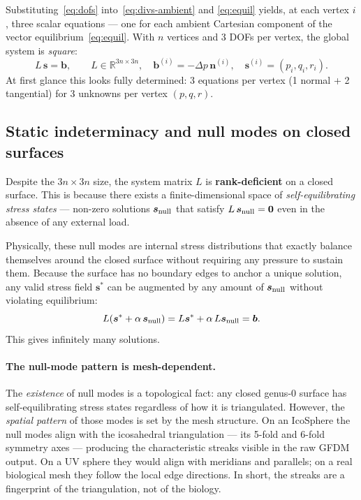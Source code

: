 \documentclass[11pt]{article}
\newcommand{\vv}[1]{\bm{#1}}          %
\newcommand{\nn}{\vv{n}}               %
\begin{document}
Substituting~\eqref{eq:dofs} into~\eqref{eq:divs-ambient} and
\eqref{eq:equil} yields, at each vertex $i$, three scalar equations —
one for each ambient Cartesian component of the vector
equilibrium~\eqref{eq:equil}.  With $n$ vertices and 3 DOFs per vertex,
the global system is \emph{square}:
\begin{equation}
  L\,\vv{s} = \vv{b}, \qquad
  L\in\mathbb{R}^{3n\times 3n}, \quad
  \vv{b}^{(i)} = -\Delta p\,\nn^{(i)}, \quad
  \vv{s}^{(i)} = (p_i,q_i,r_i).
  \label{eq:system}
\end{equation}
At first glance this looks fully determined: 3 equations per vertex
(1 normal + 2 tangential) for 3 unknowns per vertex $(p,q,r)$.

\subsection{Static indeterminacy and null modes on closed surfaces}
\label{sec:null-modes}

Despite the $3n\times 3n$ size, the system matrix $L$ is
\textbf{rank-deficient} on a closed surface.  This is because there
exists a finite-dimensional space of \emph{self-equilibrating stress
states} — non-zero solutions $\vv{s}_{\rm null}$ that satisfy
$L\,\vv{s}_{\rm null}=\vv{0}$ even in the absence of any external load.

Physically, these null modes are internal stress distributions that
exactly balance themselves around the closed surface without requiring any
pressure to sustain them.  Because the surface has no boundary edges to
anchor a unique solution, any valid stress field $\vv{s}^*$ can be augmented
by any amount of $\vv{s}_{\rm null}$ without violating equilibrium:
\[
  L(\vv{s}^*+\alpha\,\vv{s}_{\rm null}) = L\vv{s}^* + \alpha\,L\vv{s}_{\rm null} = \vv{b}.
\]
This gives infinitely many solutions.

\paragraph{The null-mode pattern is mesh-dependent.}
The \emph{existence} of null modes is a topological fact: any closed
genus-0 surface has self-equilibrating stress states regardless of how
it is triangulated.  However, the \emph{spatial pattern} of those modes
is set by the mesh structure.  On an IcoSphere the null modes align with
the icosahedral triangulation — its 5-fold and 6-fold symmetry axes —
producing the characteristic streaks visible in the raw GFDM output.
On a UV sphere they would align with meridians and parallels; on a real
biological mesh they follow the local edge directions.  In short, the
streaks are a fingerprint of the triangulation, not of the biology.
\end{document}
